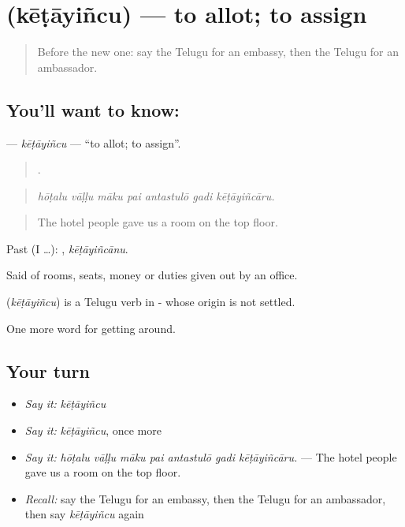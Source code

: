 \section[\texorpdfstring{\te{కేటాయించు} (kēṭāyiñcu)}{కేటాయించు (kēṭāyiñcu)}]{ (kēṭāyiñcu) — to allot; to assign}

\label{lesson:TE-C463-ketayincu}



\begin{quote}
Before the new one: say the Telugu for an embassy, then the Telugu for an ambassador.
\end{quote}

\subsection*{You'll want to know: }
\textbf{} — \emph{kēṭāyiñcu} — \textquotedblleft{}to allot; to assign\textquotedblright{}.

\begin{quote}
      .
\end{quote}

\begin{quote}
\emph{hōṭalu vāḷḷu māku pai antastulō gadi kēṭāyiñcāru.}
\end{quote}

\begin{quote}
The hotel people gave us a room on the top floor.
\end{quote}

Past (I …): , \emph{kēṭāyiñcānu}.

Said of rooms, seats, money or duties given out by an office.

\begin{cousinweb}
\textbf{} (\emph{kēṭāyiñcu}) is a Telugu verb in - whose origin is not settled.
\end{cousinweb}

\begin{grammarlens}[title={What you've built}]
One more word for getting around.
\end{grammarlens}

\subsection*{Your turn}
\begin{itemize}
\raggedright
  \item \emph{Say it:} \emph{kēṭāyiñcu}
  \item \emph{Say it:} \emph{kēṭāyiñcu}, once more
  \item \emph{Say it:} \emph{hōṭalu vāḷḷu māku pai antastulō gadi kēṭāyiñcāru.} — The hotel people gave us a room on the top floor.
  \item \emph{Recall:} say the Telugu for an embassy, then the Telugu for an ambassador, then say \emph{kēṭāyiñcu} again
\end{itemize}

